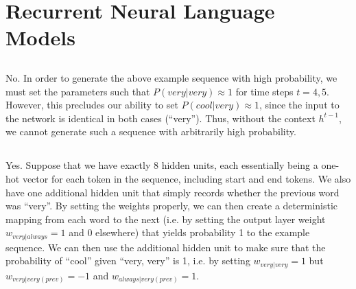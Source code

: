 \documentclass[psamsfonts]{amsart}
\theoremstyle{definition}
\theoremstyle{remark}
\numberwithin{equation}{section}
\begin{document}
\section{Recurrent Neural Language Models}

\subsection{} No. In order to generate the above example sequence with high probability, we must set the parameters such that $P(very|very) \approx 1$ for time steps $t = 4, 5$. However, this precludes our ability to set $P(cool|very) \approx 1$, since the input to the network is identical in both cases (``very''). Thus, without the context $h^{t-1}$, we cannot generate such a sequence with arbitrarily high probability.

\subsection{} Yes. Suppose that we have exactly $8$ hidden units, each essentially being a one-hot vector for each token in the sequence, including start and end tokens. We also have one additional hidden unit that simply records whether the previous word was ``very''. By setting the weights properly, we can then create a deterministic mapping from each word to the next (i.e. by setting the output layer weight $w_{very|always} = 1$ and 0 elsewhere) that yields probability 1 to the example sequence. We can then use the additional hidden unit to make sure that the probability of ``cool'' given ``very, very'' is 1, i.e. by setting $w_{very|very} = 1$ but $w_{very|very(prev)} = -1$ and $w_{always|very(prev)} = 1$.
\end{document}
